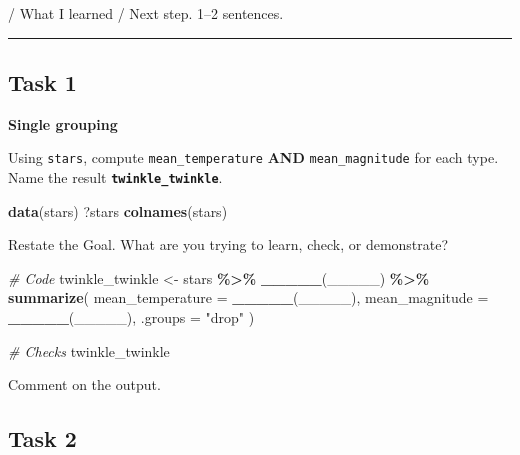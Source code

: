 \documentclass[
]{article}
\newenvironment{Shaded}{\begin{snugshade}}{\end{snugshade}}
\newcommand{\AttributeTok}[1]{\textcolor[rgb]{0.13,0.29,0.53}{#1}}
\newcommand{\CommentTok}[1]{\textcolor[rgb]{0.56,0.35,0.01}{\textit{#1}}}
\newcommand{\FunctionTok}[1]{\textcolor[rgb]{0.13,0.29,0.53}{\textbf{#1}}}
\newcommand{\NormalTok}[1]{#1}
\newcommand{\OtherTok}[1]{\textcolor[rgb]{0.56,0.35,0.01}{#1}}
\newcommand{\SpecialCharTok}[1]{\textcolor[rgb]{0.81,0.36,0.00}{\textbf{#1}}}
\newcommand{\StringTok}[1]{\textcolor[rgb]{0.31,0.60,0.02}{#1}}
\begin{document}
/ What I learned / Next step. 1--2 sentences.

\begin{center}\rule{0.5\linewidth}{0.5pt}\end{center}

\subsection{Task 1}\label{task-1}

\textbf{Single grouping}

Using \texttt{stars}, compute \texttt{mean\_temperature} \textbf{AND}
\texttt{mean\_magnitude} for each type. Name the result
\textbf{\texttt{twinkle\_twinkle}}.

\begin{Shaded}
\begin{Highlighting}[]
\FunctionTok{data}\NormalTok{(stars)}
\NormalTok{?stars}
\FunctionTok{colnames}\NormalTok{(stars)}
\end{Highlighting}
\end{Shaded}

Restate the Goal. What are you trying to learn, check, or demonstrate?

\begin{Shaded}
\begin{Highlighting}[]
\CommentTok{\# Code}
\NormalTok{twinkle\_twinkle }\OtherTok{\textless{}{-}}\NormalTok{ stars }\SpecialCharTok{\%\textgreater{}\%}
  \FunctionTok{\_\_\_\_\_}\NormalTok{(\_\_\_\_\_) }\SpecialCharTok{\%\textgreater{}\%}
  \FunctionTok{summarize}\NormalTok{(}
    \AttributeTok{mean\_temperature =} \FunctionTok{\_\_\_\_\_}\NormalTok{(\_\_\_\_\_),}
    \AttributeTok{mean\_magnitude   =} \FunctionTok{\_\_\_\_\_}\NormalTok{(\_\_\_\_\_),}
    \AttributeTok{.groups =} \StringTok{"drop"}
\NormalTok{  )}
\end{Highlighting}
\end{Shaded}

\begin{Shaded}
\begin{Highlighting}[]
\CommentTok{\#  Checks}
\NormalTok{twinkle\_twinkle}
\end{Highlighting}
\end{Shaded}

Comment on the output.

\subsection{Task 2}\label{task-2}
\end{document}
